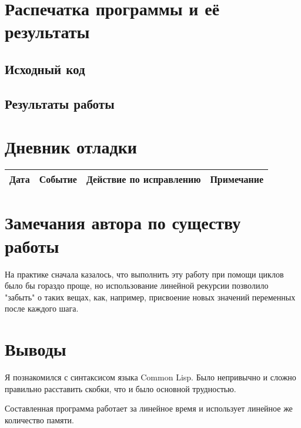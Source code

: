 \documentclass[12pt]{article}
\begin{document}
\section{Распечатка программы и её результаты}

\subsection{Исходный код}


\pagebreak
\subsection{Результаты работы}


\pagebreak
\section{Дневник отладки}
\begin{tabular}{|p{50pt}|p{80pt}|p{140pt}|p{140pt}|}
\hline
Дата & Событие & Действие по исправлению & Примечание \\
\hline
\end{tabular}

\section{Замечания автора по существу работы}
На практике сначала казалось, что выполнить эту работу при помощи циклов было бы гораздо проще, но использование линейной рекурсии 
позволило "забыть" о таких вещах, как, например,  присвоение новых значений переменных после каждого шага.

\section{Выводы}
Я познакомился с синтаксисом языка Common Lisp. Было непривычно и сложно правильно расставить скобки, что и было основной трудностью.

Составленная программа работает за линейное время и использует линейное же количество памяти.
\end{document}
